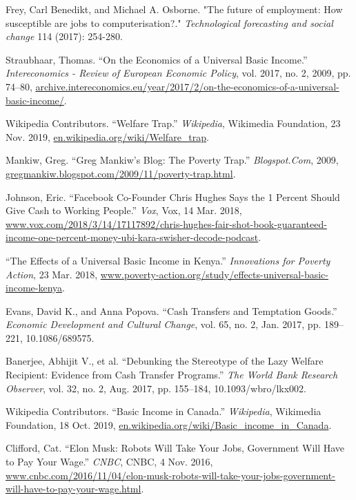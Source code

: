 \documentclass[10pt,a4paper]{article}
\begin{document}
	\begin{thebibliography}{9}
		 Frey, Carl Benedikt, and Michael A. Osborne. "The future of employment: How susceptible are jobs to computerisation?." \textit{Technological forecasting and social change }114 (2017): 254-280.
		
		 Straubhaar, Thomas. “On the Economics of a Universal Basic Income.” \textit{Intereconomics - Review of European Economic Policy}, vol. 2017, no. 2, 2009, pp. 74–80, \url{archive.intereconomics.eu/year/2017/2/on-the-economics-of-a-universal-basic-income/}.
		
		 Wikipedia Contributors. “Welfare Trap.” \textit{Wikipedia}, Wikimedia Foundation, 23 Nov. 2019, \url{en.wikipedia.org/wiki/Welfare_trap}.
		
		 Mankiw, Greg. “Greg Mankiw’s Blog: The Poverty Trap.” \textit{Blogspot.Com}, 2009, \url{gregmankiw.blogspot.com/2009/11/poverty-trap.html}.
		
		 Johnson, Eric. “Facebook Co-Founder Chris Hughes Says the 1 Percent Should Give Cash to Working People.” \textit{Vox}, Vox, 14 Mar. 2018, \url{www.vox.com/2018/3/14/17117892/chris-hughes-fair-shot-book-guaranteed-income-one-percent-money-ubi-kara-swisher-decode-podcast}.
		
		 “The Effects of a Universal Basic Income in Kenya.” \textit{Innovations for Poverty Action}, 23 Mar. 2018, \url{www.poverty-action.org/study/effects-universal-basic-income-kenya}.‌
		
		 Evans, David K., and Anna Popova. “Cash Transfers and Temptation Goods.” \textit{Economic Development and Cultural Change}, vol. 65, no. 2, Jan. 2017, pp. 189–221, 10.1086/689575.
		
		 Banerjee, Abhijit V., et al. “Debunking the Stereotype of the Lazy Welfare Recipient: Evidence from Cash Transfer Programs.” \textit{The World Bank Research Observer}, vol. 32, no. 2, Aug. 2017, pp. 155–184, 10.1093/wbro/lkx002. 
		
		 Wikipedia Contributors. “Basic Income in Canada.” \textit{Wikipedia}, Wikimedia Foundation, 18 Oct. 2019, \url{en.wikipedia.org/wiki/Basic_income_in_Canada}.
		
		 Clifford, Cat. “Elon Musk: Robots Will Take Your Jobs, Government Will Have to Pay Your Wage.” \textit{CNBC}, CNBC, 4 Nov. 2016, \url{www.cnbc.com/2016/11/04/elon-musk-robots-will-take-your-jobs-government-will-have-to-pay-your-wage.html}.
		

\end{thebibliography}
\end{document}
